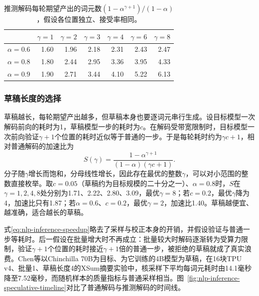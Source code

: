 \begin{table}[htbp]
 \centering
 \begin{tabular}{@{}lrrrrrr@{}}
  \toprule
  & $\gamma=1$ & $\gamma=2$ & $\gamma=3$ & $\gamma=4$ & $\gamma=6$ & $\gamma=8$\\
  \midrule
  $\alpha=0.6$ & 1.60 & 1.96 & 2.18 & 2.31 & 2.43 & 2.47\\
  $\alpha=0.8$ & 1.80 & 2.44 & 2.95 & 3.36 & 3.95 & 4.33\\
  $\alpha=0.9$ & 1.90 & 2.71 & 3.44 & 4.10 & 5.22 & 6.13\\
  \bottomrule
 \end{tabular}
 \caption{推测解码每轮期望产出的词元数$(1-\alpha^{\gamma+1})/(1-\alpha)$，假设各位置独立、接受率相同。}
 \label{tab:nlp-inference-expected-tokens}
\end{table}

\subsubsection{草稿长度的选择}
\label{sec:nlp-inference-spec-length}

草稿越长，每轮期望产出越多，但草稿本身也要逐词元串行生成。设目标模型一次解码前向的耗时为1，草稿模型一步的耗时为$c$。在解码受带宽限制时，目标模型一次前向验证$\gamma+1$个位置的耗时近似等于普通的一步。于是每轮耗时约为$\gamma c+1$，相对普通解码的加速比为
\begin{equation}
 S(\gamma)=\frac{1-\alpha^{\gamma+1}}{(1-\alpha)(\gamma c+1)}.
 \label{eq:nlp-inference-speedup}
\end{equation}
分子随$\gamma$增长而饱和，分母线性增长，因此存在最优的整数$\gamma$，可以对小范围的整数直接枚举。取$c=0.05$（草稿约为目标规模的二十分之一）、$\alpha=0.8$时，$S$在$\gamma=1,2,4,8$处分别为1.71、2.22、2.80、3.09，最优$\gamma=8$；若$c=0.2$，最优$\gamma$降为4，加速比只有1.87；若$\alpha=0.6$、$c=0.2$，最优$\gamma=2$，加速比1.40。草稿越便宜、越准确，适合越长的草稿。

式\eqref{eq:nlp-inference-speedup}略去了采样与校正本身的开销，并假设验证与普通一步等耗时。后一假设在批量增大时不再成立：批量较大时解码逐渐转为受算力限制，验证$\gamma+1$个位置的耗时接近$\gamma+1$倍的普通一步，被拒绝的草稿就成了真实浪费。Chen等以Chinchilla 70B为目标、为它训练的4B模型为草稿，在16块TPU v4、批量1、草稿长度4的XSum摘要实验中，核采样下平均每词元耗时由14.1毫秒降至7.52毫秒，而随机样本的质量指标与普通采样相当。图~\ref{fig:nlp-inference-speculative-timeline}对比了普通解码与推测解码的时间线。

